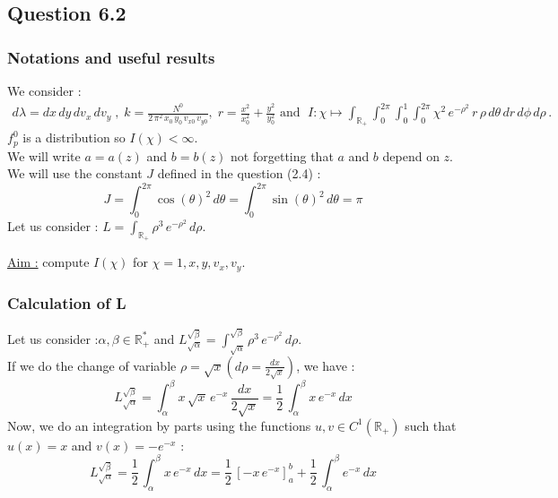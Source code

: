 \documentclass[10pt]{article}
\begin{document}
\subsection{Question 6.2}


\subsubsection{Notations and useful results}


We consider : \\
$
\begin{array}{l}
d\lambda = dx\,dy\,dv_x\,dv_y \; , \; k = \frac{N^0}{2\,\pi^{2}\,x_0\,y_0\,v_{x0}\,v_{y0}} , \; r = \frac{x^2}{x_0^2} + \frac{y^2}{y_0^2} 
 \mbox{ and } \;
I:\chi\mapsto\int_{\mathbb{R}_{+}}\int_0^{2\pi}\int_0^1\int_0^{2\pi} \chi^{2}\, e^{-\rho^{2}}\,r\,\rho\,d\theta\,dr\,d\phi\,d\rho \, .
\end{array}
$ \\

$f_p^0$ is a distribution so $I(\chi) < \infty$. \\
We will write $a = a(z)$ and $b = b(z)$ not forgetting that $a$ and $b$ depend on $z$. \\
We will use the constant $J$ defined in the question (2.4) :
$$ \boxed{J = \int_{0}^{2\pi}\cos(\theta)^2\,d\theta = \int_{0}^{2\pi}\sin(\theta)^2\,d\theta = \pi} $$
Let us  consider : $L = \int_{\mathbb{R}_+}\rho^{3}\,e^{-\rho^{2}}\,d\rho$.

\underline{Aim :} compute $I(\chi)$ for $\chi = 1, x, y, v_x, v_y$. \\

\subsubsection{Calculation of L}

Let us consider :$\alpha,\beta\in\mathbb{R}_{+}^{*}$ and
 $L_{\sqrt{\alpha}}^{\sqrt{\beta}} = \int_{\sqrt{\alpha}}^{\sqrt{\beta}}\rho^{3}\,e^{-\rho^{2}}\,d\rho$. \\
If we do the change of variable $\rho = \sqrt{x} \left(d\rho = \frac{dx}{2\sqrt{x}}\right)$, we have :
$$L_{\sqrt{\alpha}}^{\sqrt{\beta}} = \int_{\alpha}^{\beta} x\,\sqrt{x}\,e^{-x}\,\frac{dx}{2\sqrt{x}} = \frac{1}{2}\,\int_{\alpha}^{\beta} x\,e^{-x}\,dx $$
Now, we do an integration by parts using the functions $u,v\in C^1\left(\mathbb{R}_{+}\right)$ such that $u(x) = x$ and $v(x) = -e^{-x}$ : \\
$$L_{\sqrt{\alpha}}^{\sqrt{\beta}} = \frac{1}{2}\,\int_{\alpha}^{\beta} x\,e^{-x}\,dx = \frac{1}{2}\, \left[ -x\,e^{-x} \right]_a^b + \frac{1}{2}\,\int_{\alpha}^{\beta} e^{-x}\,dx  $$
\end{document}
